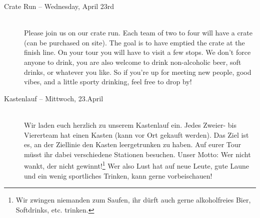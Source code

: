 \begin{description}
\ifmaster \ifmedien \pagebreak \fi \fi
\ifmaster \ifkogwiss \pagebreak \fi \fi

\ifml
\item[Crate Run -- Wednesday, April 23rd \YEAR]~\\ %
    Please join us on our crate run.
    Each team of two to four will have a crate (can be purchased on site).
    The goal is to have emptied the crate at the finish line.
    On your tour you will have to visit a few stops.
    We don't force anyone to drink, you are also welcome to drink non-alcoholic beer, soft drinks, or whatever you like.
    So if you're up for meeting new people, good vibes, and a little sporty drinking, feel free to drop by! 
\else
\item[Kastenlauf -- Mittwoch, 23.April \YEAR]~\\ %
    Wir laden euch herzlich zu unserem Kastenlauf ein.
    Jedes Zweier- bis Viererteam hat einen Kasten (kann vor Ort gekauft werden).
    Das Ziel ist es, an der Ziellinie den Kasten leergetrunken zu haben.
    Auf eurer Tour müsst ihr dabei verschiedene Stationen besuchen.
    Unser Motto: Wer nicht wankt, der nicht gewinnt!\footnote{Wir zwingen niemanden zum Saufen, ihr dürft auch gerne alkoholfreies Bier, Softdrinks, etc. trinken.}
    Wer also Lust hat auf neue Leute, gute Laune und ein wenig sportliches Trinken, kann gerne vorbeischauen! 
\fi



\end{description}

